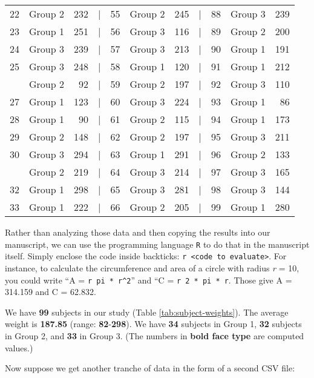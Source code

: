 \documentclass[smallextended]{svjour3}       %
\begin{document}
\begin{table}
\begin{tabular}[t]{rlrlrlrlrlr}
22 & Group 2 & 232 & | & 55 & Group 2 & 245 & | & 88 & Group 3 & 239\\
23 & Group 1 & 251 & | & 56 & Group 3 & 116 & | & 89 & Group 2 & 200\\
24 & Group 3 & 239 & | & 57 & Group 3 & 213 & | & 90 & Group 1 & 191\\
25 & Group 3 & 248 & | & 58 & Group 1 & 120 & | & 91 & Group 1 & 212\\
\addlinespace
26 & Group 2 & 92 & | & 59 & Group 2 & 197 & | & 92 & Group 3 & 110\\
27 & Group 1 & 123 & | & 60 & Group 3 & 224 & | & 93 & Group 1 & 86\\
28 & Group 1 & 90 & | & 61 & Group 2 & 115 & | & 94 & Group 1 & 173\\
29 & Group 2 & 148 & | & 62 & Group 2 & 197 & | & 95 & Group 3 & 211\\
30 & Group 3 & 294 & | & 63 & Group 1 & 291 & | & 96 & Group 2 & 133\\
\addlinespace
31 & Group 2 & 219 & | & 64 & Group 3 & 214 & | & 97 & Group 3 & 165\\
32 & Group 1 & 298 & | & 65 & Group 3 & 281 & | & 98 & Group 3 & 144\\
33 & Group 1 & 222 & | & 66 & Group 2 & 205 & | & 99 & Group 1 & 280\\
\bottomrule
\end{tabular}
\end{table}

Rather than analyzing those data and then copying the results into our manuscript, we can use the programming language \texttt{R} to do that in the manuscript itself. Simply enclose the code inside backticks: \texttt{\textasciigrave{}r\ \textless{}code\ to\ evaluate\textgreater{}\textasciigrave{}}. For instance, to calculate the circumference and area of a circle with radius \emph{r} = 10, you could write ``A = \texttt{\textasciigrave{}r\ pi\ *\ r\^{}2\textasciigrave{}}'' and ``C = \texttt{\textasciigrave{}r\ 2\ *\ pi\ *\ r\textasciigrave{}}. Those give A = 314.159 and C = 62.832.

We have \textbf{99} subjects in our study (Table \ref{tab:subject-weights}). The average weight is \textbf{187.85} (range: \textbf{82}-\textbf{298}). We have \textbf{34} subjects in Group 1, \textbf{32} subjects in Group 2, and \textbf{33} in Group 3. (The numbers in \textbf{bold face type} are computed values.)

Now suppose we get another tranche of data in the form of a second CSV file:
\end{document}
